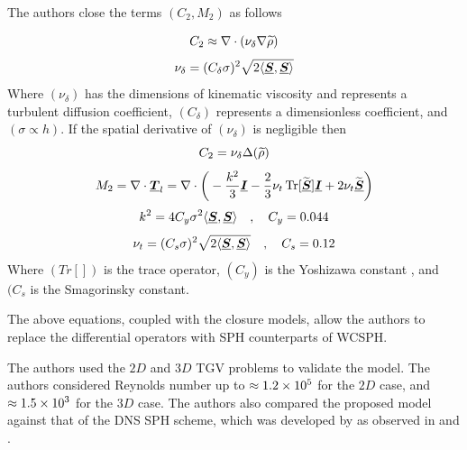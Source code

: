 The authors close the terms $(C_2, M_2)$ as follows

\begin{equation}
    C_2 \approx \nabla \cdot (\nu_{\delta} \nabla\widetilde{\rho})
\end{equation}
\begin{equation}
    \nu_{\delta} = (C_{\delta}\sigma)^2\sqrt{2\langle \underline{\bm{S}}, \underline{\bm{S}} \rangle}
\end{equation}
Where $(\nu_{\delta})$ has the dimensions of kinematic viscosity and represents a turbulent diffusion coefficient, $(C_{\delta})$ represents a dimensionless coefficient, and $(\sigma \propto h)$. If the spatial derivative of $(\nu_{\delta})$ is negligible then
\begin{equation}
    C_2 = \nu_{\delta} \Delta(\widetilde{\rho})
\end{equation}
\begin{equation}
    M_2 = \nabla \cdot \underline{\bm{T}}_l = \nabla \cdot \bigg( -\frac{k^2}{3}\underline{\bm{I}} - \frac{2}{3}\nu_t \operatorname{Tr}[\widetilde{\underline{\bm{S}}}]\underline{\bm{I}} + 2\nu_t\widetilde{\underline{\bm{S}}} \bigg)
\end{equation}
\begin{equation}
    k^2 = 4 C_y \sigma^2 \langle \underline{\bm{S}}, \underline{\bm{S}} \rangle \quad , \quad C_y=0.044
\end{equation}
\begin{equation}
    \nu_t = (C_s\sigma)^2\sqrt{2 \langle \underline{\bm{S}}, \underline{\bm{S}} \rangle} \quad , \quad C_s=0.12
\end{equation}
Where $(Tr[])$ is the trace operator, $(C_y)$ is the Yoshizawa constant \parencite{yoshizawa1986statistical}, and $(C_s$ is the Smagorinsky constant.

The above equations, coupled with the closure models, allow the authors to replace the differential operators with SPH counterparts of WCSPH.

The authors used the  $2D$ and $3D$ TGV problems to validate the model. The authors considered Reynolds number up to $\approx 1.2 \times {10}^{5}$ for the $2D$ case, and $\approx 1.5 \times {10}^{3}$ for the $3D$ case. The authors also compared the proposed model against that of the DNS SPH scheme, which was developed by \cite{mayrhofer2015dns} as observed in  and .

